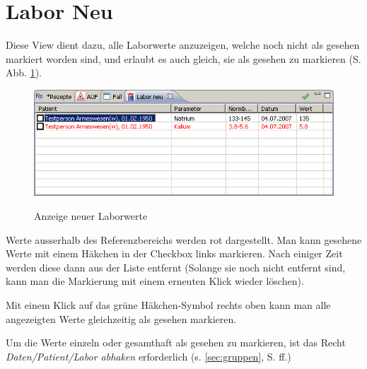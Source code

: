 \section{Labor Neu}
Diese View dient dazu, alle Laborwerte anzuzeigen, welche noch nicht als \glqq gesehen\grqq{} markiert worden sind, und erlaubt es auch gleich, sie als gesehen zu markieren (S. Abb. \ref{fig:labneu}).

\begin{figure}
  \includegraphics{images/labneu1}\\
  \caption{Anzeige neuer Laborwerte}\label{fig:labneu}
\end{figure}

Werte ausserhalb des Referenzbereichs werden rot dargestellt. Man kann gesehene Werte mit einem Häkchen in der Checkbox links markieren. Nach einiger Zeit werden diese dann aus der Liste entfernt (Solange sie noch nicht entfernt sind, kann man die Markierung mit einem erneuten Klick wieder löschen).

Mit einem Klick auf das grüne Häkchen-Symbol rechts oben kann man alle angezeigten Werte gleichzeitig als gesehen markieren.

Um die Werte einzeln oder gesamthaft als gesehen zu markieren, ist das Recht \textit{Daten/Patient/Labor abhaken} erforderlich (s. \ref{sec:gruppen}, S. \pageref{sec:gruppen}ff.)
